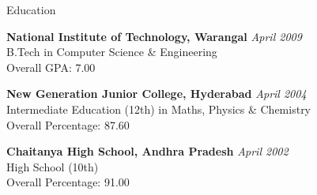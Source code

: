\documentclass{resume} %
\begin{document}

\begin{rSection}{Education}

{\bf National Institute of Technology, Warangal } \hfill {\em April 2009} \\ 
B.Tech in Computer Science \& Engineering \\
Overall GPA: 7.00

{\bf New Generation Junior College, Hyderabad } \hfill {\em April 2004} \\ 
Intermediate Education (12th) in Maths, Physics \& Chemistry \\
Overall Percentage: 87.60

{\bf Chaitanya High School, Andhra Pradesh } \hfill {\em April 2002} \\ 
High School (10th) \\
Overall Percentage: 91.00

\end{rSection}

\end{document}
